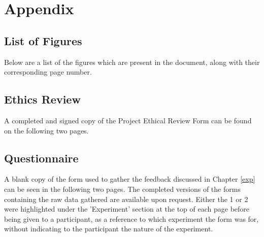 \chapter{Appendix}
\label{appendix}

	\begingroup
		\section{List of Figures}
		\label{appendix:figures}

		Below are a list of the figures which are present in the document, along with their corresponding page number.

		\renewcommand{\chapter}[2]{}		%
		\listoffigures						%
	\endgroup

	\section{Ethics Review}
	\label{appendix:ethics}
		A completed and signed copy of the Project Ethical Review Form can be found on the following two pages.

		

	\section{Questionnaire}
	\label{appendix:question}
		A blank copy of the form used to gather the feedback discussed in Chapter \ref{exp} can be seen in the following two pages. The completed versions of the forms containing the raw data gathered are available upon request. Either the 1 or 2 were highlighted under the 'Experiment' section at the top of each page before being given to a participant, as a reference to which experiment the form was for, without indicating to the participant the nature of the experiment.

		
